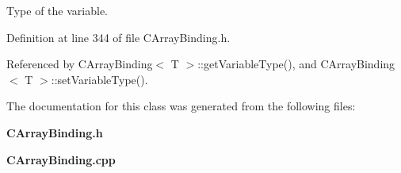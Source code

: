 Type of the variable.



Definition at line 344 of file CArray\-Binding.h.

Referenced by CArray\-Binding$<$ T $>$::get\-Variable\-Type(), and CArray\-Binding$<$ T $>$::set\-Variable\-Type().

The documentation for this class was generated from the following files:\begin{CompactItemize}
\item 
{\bf CArray\-Binding.h}\item 
{\bf CArray\-Binding.cpp}\end{CompactItemize}
